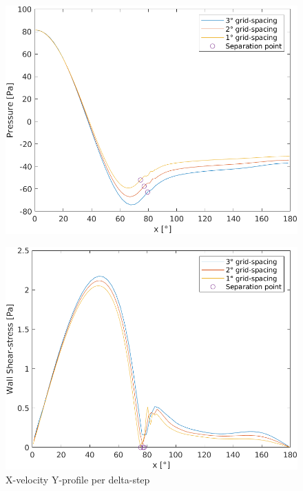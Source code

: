 \documentclass[12pt]{article}
\begin{document}
        \begin{figure}[!ht]
                \includegraphics[width=\textwidth]{Pressure_Independence.png}
                \centering
                \caption{}
                \label{fig:pression_ind}
        \end{figure}

        \begin{figure}[!ht]
                \includegraphics[width=\textwidth]{WallShearStress_Independence.png}
                \centering
                \caption{X-velocity Y-profile per delta-step}
                \label{fig:wall_ind}
        \end{figure}
\end{document}
